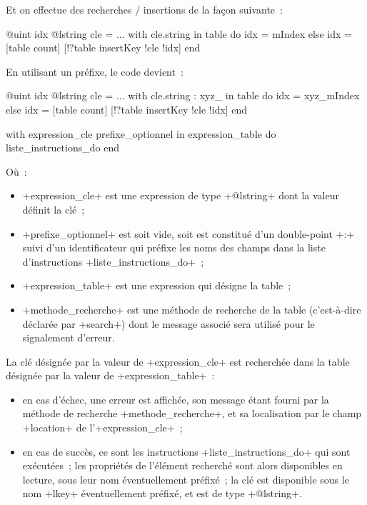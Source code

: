 Et on effectue des recherches / insertions de la façon suivante~:
\begin{galgas}
@uint idx
@lstring cle = ...
with cle.string in table do
  idx = mIndex
else
  idx = [table count]
  [!?table insertKey !cle !idx]
end
\end{galgas}

En utilisant un préfixe, le code devient~:
\begin{galgas}
@uint idx
@lstring cle = ...
with cle.string : xyz_ in table do
  idx = xyz_mIndex
else
  idx = [table count]
  [!?table insertKey !cle !idx]
end
\end{galgas}






\begin{galgas}
with expression_cle prefixe_optionnel in expression_table
do
  liste_instructions_do
end
\end{galgas}

Où~:
\begin{itemize}
  \item \ggs+expression_cle+ est une expression de type \ggs+@lstring+ dont la valeur définit la clé~;
  \item \ggs+prefixe_optionnel+ est soit vide, soit est constitué d'un double-point \ggs+:+ suivi d'un identificateur qui préfixe les noms des champs dans la liste d'instructions \ggs+liste_instructions_do+~;
  \item \ggs+expression_table+ est une expression qui désigne la table~;
  \item \ggs+methode_recherche+ est une méthode de recherche de la table (c'est-à-dire déclarée par \ggs+search+) dont le message associé sera utilisé pour le signalement d'erreur.
\end{itemize}

La clé désignée par la valeur de \ggs+expression_cle+ est recherchée dans la table désignée par la valeur de \ggs+expression_table+~:
\begin{itemize}
  \item en cas d'échec, une erreur est affichée, son message étant fourni par la méthode de recherche \ggs+methode_recherche+, et sa localisation par le champ \ggs+location+ de l'\ggs+expression_cle+~;
  \item en cas de succès, ce sont les instructions \ggs+liste_instructions_do+ qui sont exécutées~; les propriétés de l'élément recherché sont alors disponibles en lecture, sous leur nom éventuellement préfixé~; la clé est disponible sous le nom \ggs+lkey+ éventuellement préfixé, et est de type \ggs+@lstring+.
\end{itemize}

